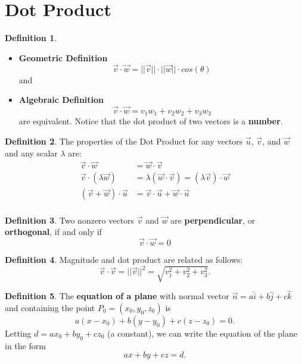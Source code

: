 \documentclass[12pt, a4paper]{article}
\theoremstyle{plain}
\theoremstyle{definition}
\newtheorem{definition}{Definition}[section]
\theoremstyle{remark}
\begin{document}
\section{Dot Product}
\begin{definition}
\begin{itemize}
Where the angle $\theta$ between $\vec{v}$ and $\vec{w}$ such that $0$ $\le$ $\theta$ $\le$ $\pi$, 

\item \textbf{Geometric Definition} 
$$\vec{v} \cdot \vec{w}= ||\vec{v}|| \cdot ||\vec{w}|| \cdot cos(\theta)$$
 and 

\item \textbf{Algebraic Definition} 
$$\vec{v} \cdot \vec{w} = v_1w_1 + v_2w_2 + v_3w_3$$ 
are equivalent. Notice that the dot product of two vectors is a \textbf{number}.
\end{itemize}
\end{definition}




\begin{definition}
The properties of the Dot Product for any vectors $\vec{u}$, $\vec{v}$, and $\vec{w}$ and any scalar $\lambda$ are:
\begin{align*}
\vec{v} \cdot \vec{w} &= \vec{w} \cdot \vec{v} \\
\vec{v} \cdot (\lambda \vec{w}) &=\lambda ( \vec{w} \cdot \vec{v}) = (\lambda \vec{v}) \cdot \vec{w} \\
(\vec{v} + \vec{w}) \cdot \vec{u} &= \vec{v} \cdot \vec{u} +  \vec{w} \cdot \vec{u} \\
\end{align*}
\end{definition}

\begin{definition}
Two nonzero vectors $\vec{v}$ and $\vec{w}$ are \textbf{perpendicular}, or \textbf{orthogonal}, if and only if $$\vec{v} \cdot \vec{w} = 0$$
\end{definition}

\begin{definition}
Magnitude and dot product are related as follows:
$$ \vec{v} \cdot \vec{v} = ||\vec{v}||^2 = \sqrt{v_1^2+v_2^2+v_3^2}.$$
\end{definition}

\begin{definition}
The \textbf{equation of a plane} with normal vector $\vec{n} = a \hat{i} + b \hat{j} + c \hat{k}$ and containing the point $P_0 = (x_0, y_0, z_0)$ is 
$$ a(x-x_0) + b(y-y_0) + c(z-z_0) = 0.$$
Letting $d= ax_0+by_0+cz_0$ (a constant), we can write the equation of the plane in the form 
$$ ax + by + cz = d.$$
\end{definition}
\end{document}
